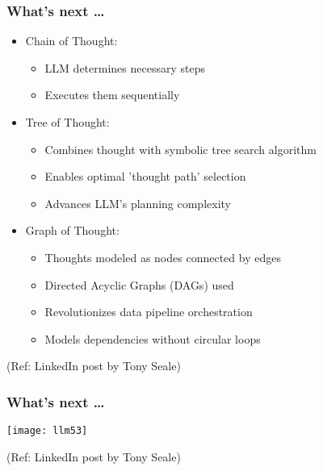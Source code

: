 





\begin{frame}[fragile]\frametitle{What's next \ldots}

\begin{itemize}
\item Chain of Thought:
	\begin{itemize}
	\item LLM determines necessary steps
	\item Executes them sequentially
	\end{itemize}
	
\item Tree of Thought:
	\begin{itemize}
	\item Combines thought with symbolic tree search algorithm
	\item Enables optimal 'thought path' selection
	\item Advances LLM's planning complexity
	\end{itemize}
	
\item Graph of Thought:
	\begin{itemize}
	\item Thoughts modeled as nodes connected by edges
	\item Directed Acyclic Graphs (DAGs) used
	\item Revolutionizes data pipeline orchestration
	\item Models dependencies without circular loops
	\end{itemize}
	
\end{itemize}

{\tiny (Ref: LinkedIn post by Tony Seale)}

\end{frame}

\begin{frame}[fragile]\frametitle{What's next \ldots}

\begin{center}
\texttt{[image: llm53]}
\end{center}	

{\tiny (Ref: LinkedIn post by Tony Seale)}

	
\end{frame}



